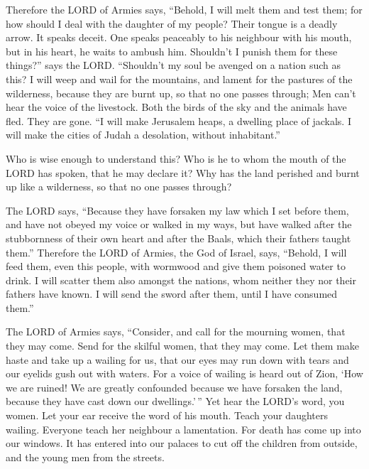  Therefore the LORD of Armies says, ``Behold, I will melt
them and test them; for how should I deal with the daughter of my
people?  Their tongue is a deadly arrow. It speaks deceit.
One speaks peaceably to his neighbour with his mouth, but in his heart,
he waits to ambush him.  Shouldn't I punish them for these
things?'' says the LORD. ``Shouldn't my soul be avenged on a nation such
as this?  I will weep and wail for the mountains, and
lament for the pastures of the wilderness, because they are burnt up, so
that no one passes through; Men can't hear the voice of the livestock.
Both the birds of the sky and the animals have fled. They are gone.
 ``I will make Jerusalem heaps, a dwelling place of
jackals. I will make the cities of Judah a desolation, without
inhabitant.''

 Who is wise enough to understand this? Who is he to whom
the mouth of the LORD has spoken, that he may declare it? Why has the
land perished and burnt up like a wilderness, so that no one passes
through?

 The LORD says, ``Because they have forsaken my law which
I set before them, and have not obeyed my voice or walked in my ways,
 but have walked after the stubbornness of their own
heart and after the Baals, which their fathers taught them.''
 Therefore the LORD of Armies, the God of Israel, says,
``Behold, I will feed them, even this people, with wormwood and give
them poisoned water to drink.  I will scatter them also
amongst the nations, whom neither they nor their fathers have known. I
will send the sword after them, until I have consumed them.''

 The LORD of Armies says, ``Consider, and call for the
mourning women, that they may come. Send for the skilful women, that
they may come.  Let them make haste and take up a wailing
for us, that our eyes may run down with tears and our eyelids gush out
with waters.  For a voice of wailing is heard out of
Zion, `How we are ruined! We are greatly confounded because we have
forsaken the land, because they have cast down our dwellings.'\,''
 Yet hear the LORD's word, you women. Let your ear
receive the word of his mouth. Teach your daughters wailing. Everyone
teach her neighbour a lamentation.  For death has come up
into our windows. It has entered into our palaces to cut off the
children from outside, and the young men from the streets.

